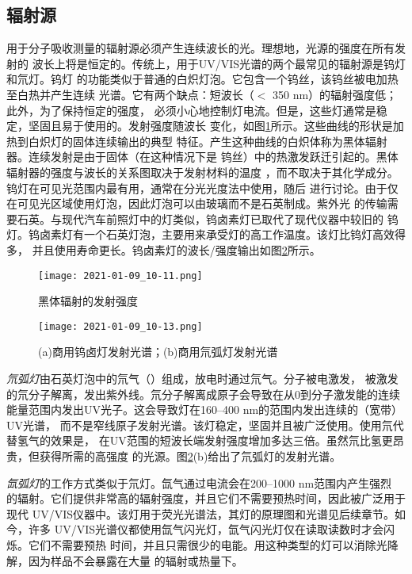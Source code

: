 \subsection{辐射源}
用于分子吸收测量的辐射源必须产生连续波长的光。理想地，光源的强度在所有发射的
波长上将是恒定的。传统上，用于UV/VIS光谱的两个最常见的辐射源是钨灯和氘灯。钨灯
的功能类似于普通的白炽灯泡。它包含一个钨丝，该钨丝被电加热至白热并产生连续
光谱。它有两个缺点：短波长（$<$ 350 nm）的辐射强度低；此外，为了保持恒定的强度，
必须小心地控制灯电流。但是，这些灯通常是稳定，坚固且易于使用的。发射强度随波长
变化，如图\ref{fig:5.13}所示。这些曲线的形状是加热到白炽灯的固体连续输出的典型
特征。产生这种曲线的白炽体称为黑体辐射器。连续发射是由于固体（在这种情况下是
钨丝）中的热激发跃迁引起的。黑体辐射器的强度与波长的关系图取决于发射材料的温度
，而不取决于其化学成分。钨灯在可见光范围内最有用，通常在分光光度法中使用，随后
进行讨论。由于仅在可见光区域使用灯泡，因此灯泡可以由玻璃而不是石英制成。紫外光
的传输需要石英。与现代汽车前照灯中的灯类似，钨卤素灯已取代了现代仪器中较旧的
钨灯。钨卤素灯有一个石英灯泡，主要用来承受灯的高工作温度。该灯比钨灯高效得多，
并且使用寿命更长。钨卤素灯的波长/强度输出如图\ref{fig:5.14}所示。
\begin{figure}[htpb]
    \centering
    \texttt{[image: 2021-01-09\_10-11.png]}
    \caption{黑体辐射的发射强度}
    \label{fig:5.13}
\end{figure}
\begin{figure}[htpb]
    \centering
    \texttt{[image: 2021-01-09\_10-13.png]}
    \caption{(a)商用钨卤灯发射光谱；(b)商用氘弧灯发射光谱}
    \label{fig:5.14}
\end{figure}

\emph{氘弧灯}由石英灯泡中的氘气（）组成，放电时通过氘气。分子被电激发，
被激发的氘分子解离，发出紫外线。氘分子解离成原子会导致在从0到分子激发能的连续
能量范围内发出UV光子。这会导致灯在160--400 nm的范围内发出连续的（宽带）UV光谱，
而不是窄线原子发射光谱。该灯稳定，坚固并且被广泛使用。使用氘代替氢气的效果是，
在UV范围的短波长端发射强度增加多达三倍。虽然氘比氢更昂贵，但获得所需的高强度
的光源。图\ref{fig:5.14}(b)给出了氘弧灯的发射光谱。

\emph{氙弧灯}的工作方式类似于氘灯。氙气通过电流会在200--1000 nm范围内产生强烈
的辐射。它们提供非常高的辐射强度，并且它们不需要预热时间，因此被广泛用于现代
UV/VIS仪器中。该灯用于荧光光谱法，其灯的原理图和光谱见后续章节。如今，许多
UV/VIS光谱仪都使用氙气闪光灯，氙气闪光灯仅在读取读数时才会闪烁。它们不需要预热
时间，并且只需很少的电能。用这种类型的灯可以消除光降解，因为样品不会暴露在大量
的辐射或热量下。

